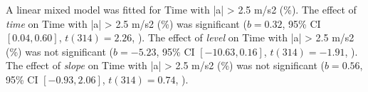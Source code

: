 A linear mixed model was fitted for Time with |a| \textgreater{} 2.5 m/s2 (\%).
The effect of \textit{time} on Time with |a| \textgreater{} 2.5 m/s2 (\%) was significant ($b = 0.32$, 95\% CI $[0.04, 0.60]$, $t(314) = 2.26$, ).
The effect of \textit{level} on Time with |a| \textgreater{} 2.5 m/s2 (\%) was not significant ($b = -5.23$, 95\% CI $[-10.63, 0.16]$, $t(314) = -1.91$, ).
The effect of \textit{slope} on Time with |a| \textgreater{} 2.5 m/s2 (\%) was not significant ($b = 0.56$, 95\% CI $[-0.93, 2.06]$, $t(314) = 0.74$, ).
